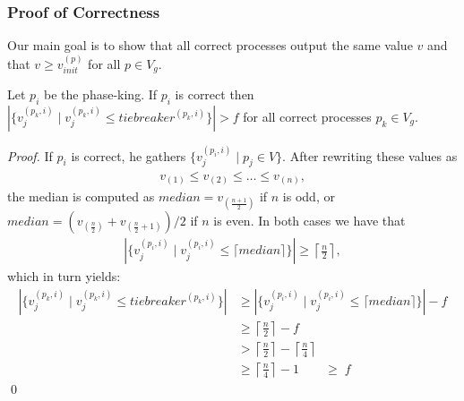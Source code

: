 \documentclass[runningheads]{llncs}
\begin{document}
\subsubsection{Proof of Correctness} Our main goal is to show that all correct processes output the same value $v$ and that $v \geq v_{init}^{(p)}$ for all $p \in V_g$.

\begin{lemma}\label{lemma:maxpk1}
    Let $p_i$ be the phase-king. If $p_i$ is correct then $|\{v_j^{(p_k,i)} \mid v_j^{(p_k,i)} \leq tiebreaker^{(p_k,i)}\}| > f$ for all correct processes $p_k \in V_g$.
\end{lemma}

\begin{proof}
    If $p_i$ is correct, he gathers $\{v_j^{(p_i,i)} \mid p_j \in V\}$. After rewriting these values as 
    \begin{align*}
        v_{(1)} \leq v_{(2)} \leq \ldots \leq v_{(n)},
    \end{align*}
    the median is computed as $median = v_{(\frac{n+1}{2})}$ if $n$ is odd, or $median = (v_{(\frac{n}{2})} + v_{(\frac{n}{2}+1)})/2$ if $n$ is even. In both cases we have that 
    \begin{align*}
        |\{v_j^{(p_i,i)} \mid v_j^{(p_i,i)} \leq \lceil median \rceil\}| \geq \left\lceil \frac{n}{2} \right\rceil,
    \end{align*} 
    which in turn yields:
    \begin{align*}
        |\{v_j^{(p_k,i)} \mid v_j^{(p_k,i)} \leq tiebreaker^{(p_k,i)}\}| &\geq |\{v_j^{(p_i,i)} \mid v_j^{(p_i,i)} \leq \lceil median \rceil\}| - f \\
        &\geq \left\lceil \frac{n}{2} \right\rceil - f \\
        &> \left\lceil \frac{n}{2} \right\rceil - \left\lceil \frac{n}{4} \right\rceil  \\
        &\geq \left\lceil \frac{n}{4} \right\rceil - 1 \qquad \geq \; f
    \end{align*} \qed
\end{proof}
\end{document}
